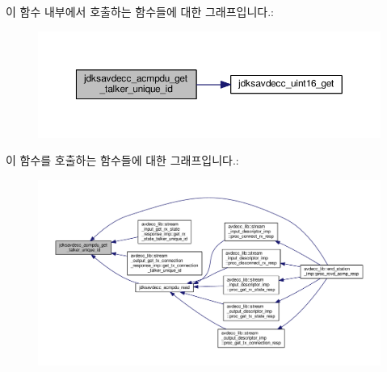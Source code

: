 이 함수 내부에서 호출하는 함수들에 대한 그래프입니다.\+:
\nopagebreak
\begin{figure}[H]
\begin{center}
\leavevmode
\includegraphics[width=350pt]{group__acmpdu_ga1f24a73adfcd4cf526ad8c10a6f2e42f_cgraph}
\end{center}
\end{figure}




이 함수를 호출하는 함수들에 대한 그래프입니다.\+:
\nopagebreak
\begin{figure}[H]
\begin{center}
\leavevmode
\includegraphics[width=350pt]{group__acmpdu_ga1f24a73adfcd4cf526ad8c10a6f2e42f_icgraph}
\end{center}
\end{figure}


